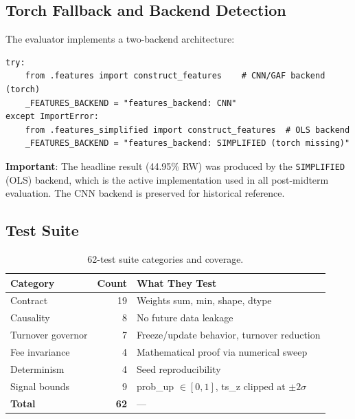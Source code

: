 \documentclass[11pt,letterpaper]{article}
\begin{document}
\subsection{Torch Fallback and Backend Detection}

The evaluator implements a two-backend architecture:

\begin{lstlisting}[style=python,
  caption={Torch fallback in \texttt{tournament\_mode/evaluator.py}.}]
try:
    from .features import construct_features    # CNN/GAF backend (torch)
    _FEATURES_BACKEND = "features_backend: CNN"
except ImportError:
    from .features_simplified import construct_features  # OLS backend
    _FEATURES_BACKEND = "features_backend: SIMPLIFIED (torch missing)"
\end{lstlisting}

\textbf{Important}: The headline result (44.95\% RW) was produced by the
\texttt{SIMPLIFIED} (OLS) backend, which is the active implementation used in
all post-midterm evaluation.  The CNN backend is preserved for historical
reference.

\subsection{Test Suite}

\begin{table}[H]
  \centering
  \caption{62-test suite categories and coverage.}
  \label{tab:tests}
  \begin{tabular}{lrl}
    \toprule
    \textbf{Category} & \textbf{Count} & \textbf{What They Test} \\
    \midrule
    Contract        & 19 & Weights sum, min, shape, dtype \\
    Causality       &  8 & No future data leakage \\
    Turnover governor& 7 & Freeze/update behavior, turnover reduction \\
    Fee invariance  &  4 & Mathematical proof via numerical sweep \\
    Determinism     &  4 & Seed reproducibility \\
    Signal bounds   &  9 & prob\_up $\in [0,1]$, ts\_z clipped at $\pm2\sigma$ \\
    \midrule
    \textbf{Total}  & \textbf{62} & --- \\
    \bottomrule
  \end{tabular}
\end{table}
\end{document}
